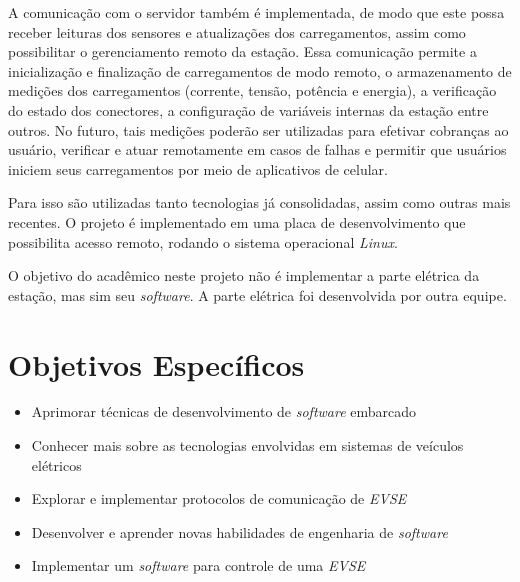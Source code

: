     A comunicação com o servidor também é implementada, de modo que este possa receber leituras dos sensores e atualizações dos carregamentos, assim como possibilitar o gerenciamento remoto da estação. Essa comunicação permite a inicialização e finalização de carregamentos de modo remoto, o armazenamento de medições dos carregamentos (corrente, tensão, potência e energia), a verificação do estado dos conectores, a configuração de variáveis internas da estação entre outros. No futuro, tais medições poderão ser utilizadas para efetivar cobranças ao usuário, verificar e atuar remotamente em casos de falhas e permitir que usuários iniciem seus carregamentos por meio de aplicativos de celular.

    Para isso são utilizadas tanto tecnologias já consolidadas, assim como outras mais recentes. O projeto é implementado em uma placa de desenvolvimento que possibilita acesso remoto, rodando o sistema operacional \textit{Linux}.

    O objetivo do acadêmico neste projeto não é implementar a parte elétrica da estação, mas sim seu \textit{software}. A parte elétrica foi desenvolvida por outra equipe.

  \section{Objetivos Específicos}
  \label{stateofart:intro:specificobjectives}

    \begin{itemize}
      \item Aprimorar técnicas de desenvolvimento de \textit{software} embarcado
      \item Conhecer mais sobre as tecnologias envolvidas em sistemas de veículos elétricos
      \item Explorar e implementar protocolos de comunicação de \textit{\ac{EVSE}}
      \item Desenvolver e aprender novas habilidades de engenharia de \textit{software}
      \item Implementar um \textit{software} para controle de uma \textit{\ac{EVSE}}
    \end{itemize}
